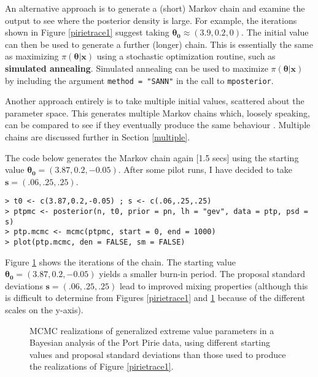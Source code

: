 \documentclass[11pt,a4paper]{article}
\newcommand{\bs}{\boldsymbol}
\begin{document}
An alternative approach is to generate a (short) Markov chain and examine the output to see where the posterior density is large.
For example, the iterations shown in Figure \ref{pirietrace1} suggest taking $\bs{\theta_0} \approx (3.9,0.2,0)$.
The initial value can then be used to generate a further (longer) chain.
This is essentially the same as maximizing $\pi(\bs{\theta}|\bs{x})$ using a stochastic optimization routine, such as \textbf{simulated annealing}.
Simulated annealing can be used to maximize $\pi(\bs{\theta}|\bs{x})$ by including the argument \verb+method = "SANN"+ in the call to \verb+mposterior+.

Another approach entirely is to take multiple initial values, scattered about the parameter space.
This generates multiple Markov chains which, loosely speaking, can be compared to see if they eventually produce the same behaviour \citep{gelmrubi92}.
Multiple chains are discussed further in Section \ref{multiple}.

The code below generates the Markov chain again [1.5 secs] using the starting value $\bs{\theta_0} = (3.87,0.2,-0.05)$.
After some pilot runs, I have decided to take $\bs{s} = (.06,.25,.25)$.

\begin{verbatim}
> t0 <- c(3.87,0.2,-0.05) ; s <- c(.06,.25,.25)
> ptpmc <- posterior(n, t0, prior = pn, lh = "gev", data = ptp, psd = s)
> ptp.mcmc <- mcmc(ptpmc, start = 0, end = 1000)
> plot(ptp.mcmc, den = FALSE, sm = FALSE)
\end{verbatim}

Figure \ref{pirietrace2} shows the iterations of the chain.
The starting value $\bs{\theta_0} = (3.87,0.2,-0.05)$ yields a smaller burn-in period.
The proposal standard deviations $\bs{s} = (.06,.25,.25)$ lead to improved mixing properties (although this is difficult to determine from Figures \ref{pirietrace1} and \ref{pirietrace2} because of the different scales on the y-axis).

\begin{figure}
\begin{center}
\vspace{-1.5cm}
\hspace{0cm}
\hspace{0cm}
\end{center}
\caption{MCMC realizations of generalized extreme value parameters in a Bayesian analysis of the Port Pirie data, using different starting values and proposal standard deviations than those used to produce the realizations of Figure \ref{pirietrace1}.}
\label{pirietrace2}
\end{figure}
\end{document}
